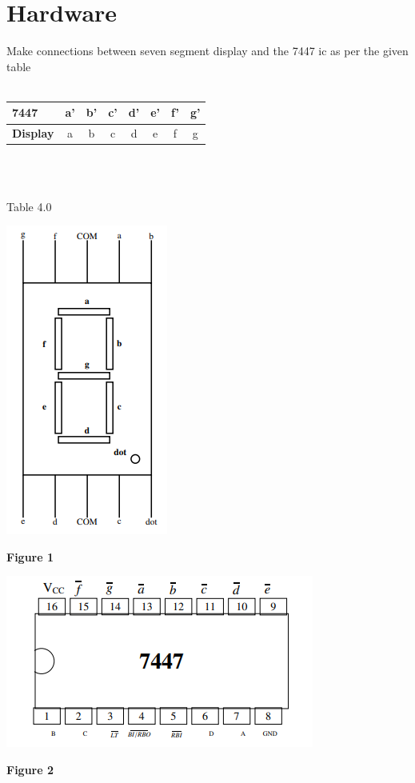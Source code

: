 \documentclass[journal,12pt,twocolumn]{IEEEtran}
\begin{document}
\section{Hardware}
\raggedright
Make connections between seven segment display and the 7447 ic as per the given table\\
\
\centering
\\\begin{tabular}{|l|c|c|c|c|c|c|c|}
\hline
\textbf{7447} & a' & b' & c' & d' & e' & f' & g'\\
\hline
\textbf{Display} & a & b & c & d & e & f & g\\
\hline
\end{tabular}\\
\
\centerline{Table 4.0}


\includegraphics{ss fig.png}
\begin{center}
\textbf{Figure 1}
\end{center}

\includegraphics{ic fig.png}
\begin{center}

\textbf{Figure 2} \\

\end{center}
\centering
\end{document}
